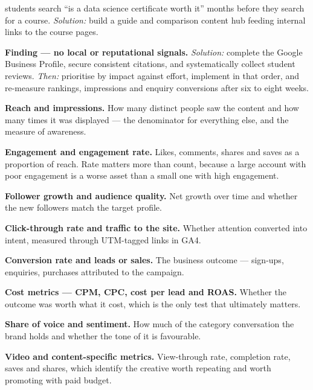 \begin{qlist}
\begin{apts}
      students search ``is a data science certificate worth it'' months before
      they search for a course. \emph{Solution:} build a guide and comparison
      content hub feeding internal links to the course pages.
\item \textbf{Finding --- no local or reputational signals.} \emph{Solution:}
      complete the Google Business Profile, secure consistent citations, and
      systematically collect student reviews. \emph{Then:} prioritise by impact
      against effort, implement in that order, and re-measure rankings,
      impressions and enquiry conversions after six to eight weeks.
\end{apts}

\begin{apts}
\item \textbf{Reach and impressions.} How many distinct people saw the content
      and how many times it was displayed --- the denominator for everything
      else, and the measure of awareness.
\item \textbf{Engagement and engagement rate.} Likes, comments, shares and
      saves as a proportion of reach. Rate matters more than count, because a
      large account with poor engagement is a worse asset than a small one with
      high engagement.
\item \textbf{Follower growth and audience quality.} Net growth over time and
      whether the new followers match the target profile.
\item \textbf{Click-through rate and traffic to the site.} Whether attention
      converted into intent, measured through UTM-tagged links in GA4.
\item \textbf{Conversion rate and leads or sales.} The business outcome ---
      sign-ups, enquiries, purchases attributed to the campaign.
\item \textbf{Cost metrics --- CPM, CPC, cost per lead and ROAS.} Whether the
      outcome was worth what it cost, which is the only test that ultimately
      matters.
\item \textbf{Share of voice and sentiment.} How much of the category
      conversation the brand holds and whether the tone of it is favourable.
\item \textbf{Video and content-specific metrics.} View-through rate,
      completion rate, saves and shares, which identify the creative worth
      repeating and worth promoting with paid budget.
\end{apts}


\end{qlist}
